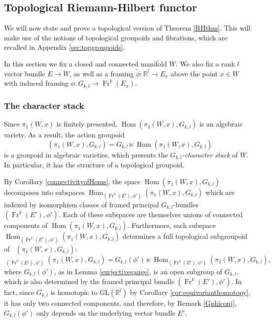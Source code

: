 \documentclass[10pt]{amsart}
\newcommand{\Hom}{\operatorname{Hom}}
\DeclareMathOperator{\Rep}{\underline{\operatorname{Rep}}}
\newcommand{\Fr}{{\operatorname{Fr}}}
\numberwithin{theoremalpha}{section}
\numberwithin{equation}{section}
\numberwithin{definition}{section}
\numberwithin{theorem}{section}
\numberwithin{proposition}{section}
\numberwithin{lemma}{section}
\numberwithin{example}{section}
\numberwithin{remark}{section}
\numberwithin{corollary}{section}
\numberwithin{question}{section}
\numberwithin{problem}{section}
\numberwithin{assumption}{section}
\theoremstyle{named}
\numberwithin{equation}{section}
\begin{document}
\subsection{Topological Riemann-Hilbert functor} \label{TopRHstatement}

We will now state and prove a topological version of Theorem \ref{RHthm}. This will make use of the notions of topological groupoids and fibrations, which are recalled in Appendix \ref{sec:topgroupoids}. 

In this section we fix a closed and connected manifold $W$. We also fix a rank $l$ vector bundle $E \to W$, as well as a framing $\tilde{\phi} : \mathbb{R}^l \to E_{x}$ above the point $x \in W$ with induced framing $\phi : G_{k,l} \rightarrow \Fr^k(E_x)$.


\subsubsection{The character stack}

Since $\pi_{1}(W,x)$ is finitely presented, $\Hom(\pi_{1}(W,x), G_{k,l})$ is an algebraic variety. As a result, the action groupoid 
\[ \Rep(\pi_{1}(W, x), G_{k,l}) = G_{k,l} \ltimes \Hom(\pi_{1}(W,x), G_{k,l}) \]
is a groupoid in algebraic varieties, which presents the \emph{$G_{k,l}$-character stack} of $W$. In particular, it has the structure of a topological groupoid. 

By Corollary \ref{connectivityofHoms}, the space $\Hom(\pi_{1}(W,x), G_{k,l})$ decomposes into subspaces $\Hom_{(\Fr^k(E'),\phi')}(\pi_{1}(W, x), G_{k,l})$ which are indexed by isomorphism classes of framed principal $G_{k,l}$-bundles $(\Fr^k(E'),\phi')$. Each of these subspaces are themselves unions of connected components of $\Hom(\pi_{1}(W,x), G_{k,l})$. Furthermore, each subspace $\Hom_{(\Fr^k(E'),\phi')}(\pi_{1}(W, x), G_{k,l})$ determines a full topological subgroupoid of $\Rep(\pi_{1}(W, x), G_{k,l})$: 
\[
\Rep_{(\Fr^k(E'),\phi')}(\pi_{1}(W, x), G_{k,l}) = G_{k,l}(\phi') \ltimes \Hom_{(\Fr^k(E'),\phi')}(\pi_{1}(W, x), G_{k,l}),
\]
where $G_{k,l}(\phi')$, as in Lemma \ref{surjectivegauge}, is an open subgroup of $G_{k,l}$, which is also determined by the framed principal bundle $(\Fr^k(E'),\phi')$. In fact, since $G_{k,l}$ is homotopic to $\mathrm{GL}(\mathbb{R}^l)$ by Corollary \ref{cor:equivarianthomotopy}, it has only two connected components, and therefore, by Remark \ref{Gphiconj}, $G_{k,l}(\phi')$ only depends on the underlying vector bundle $E'$. 
\end{document}
